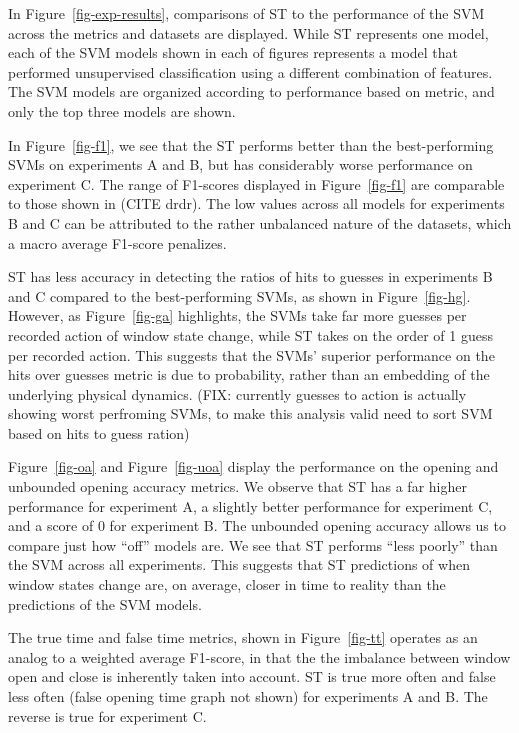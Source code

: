 \documentclass[sigconf]{acmart}
\begin{document}
In Figure~\ref{fig-exp-results}, comparisons of ST to the performance of
the SVM across the metrics and datasets are displayed. While ST
represents one model, each of the SVM models shown in each of figures
represents a model that performed unsupervised classification using a
different combination of features. The SVM models are organized
according to performance based on metric, and only the top three models
are shown.

In Figure~\ref{fig-f1}, we see that the ST performs better than the
best-performing SVMs on experiments A and B, but has considerably worse
performance on experiment C. The range of F1-scores displayed in
Figure~\ref{fig-f1} are comparable to those shown in (CITE drdr). The
low values across all models for experiments B and C can be attributed
to the rather unbalanced nature of the datasets, which a macro average
F1-score penalizes.

ST has less accuracy in detecting the ratios of hits to guesses in
experiments B and C compared to the best-performing SVMs, as shown in
Figure~\ref{fig-hg}. However, as Figure~\ref{fig-ga} highlights, the
SVMs take far more guesses per recorded action of window state change,
while ST takes on the order of 1 guess per recorded action. This
suggests that the SVMs' superior performance on the hits over guesses
metric is due to probability, rather than an embedding of the underlying
physical dynamics. (FIX: currently guesses to action is actually showing
worst perfroming SVMs, to make this analysis valid need to sort SVM
based on hits to guess ration)

Figure~\ref{fig-oa} and Figure~\ref{fig-uoa} display the performance on
the opening and unbounded opening accuracy metrics. We observe that ST
has a far higher performance for experiment A, a slightly better
performance for experiment C, and a score of 0 for experiment B. The
unbounded opening accuracy allows us to compare just how ``off'' models
are. We see that ST performs ``less poorly'' than the SVM across all
experiments. This suggests that ST predictions of when window states
change are, on average, closer in time to reality than the predictions
of the SVM models.

The true time and false time metrics, shown in Figure~\ref{fig-tt}
operates as an analog to a weighted average F1-score, in that the the
imbalance between window open and close is inherently taken into
account. ST is true more often and false less often (false opening time
graph not shown) for experiments A and B. The reverse is true for
experiment C.
\end{document}
